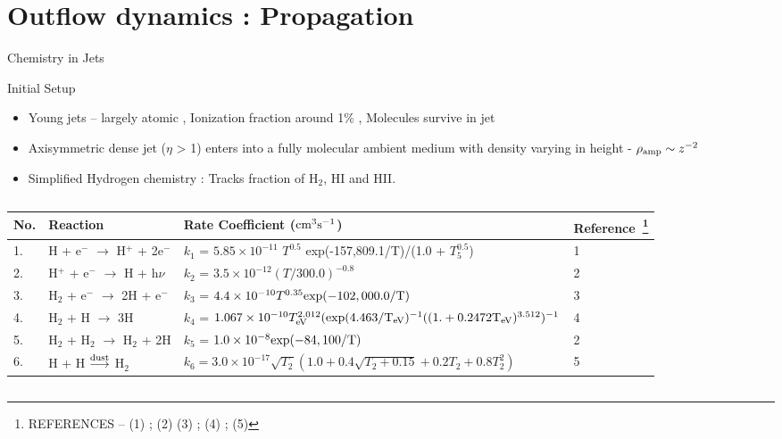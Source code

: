 \documentclass[8pt,xcolor=dvipsnames]{beamer}
\newcommand{\myref}[1]{{\small{\color{red}{(#1)}}}}
\begin{document}
\section{Outflow dynamics : Propagation}

\begin{frame}{Chemistry in Jets}
\begin{block}{Initial Setup}
\begin{itemize}
\item Young jets -- largely atomic \myref{Dionatos 2009}, Ionization
  fraction around 1\% \myref{Bacciotti 1995}, Molecules survive in jet
  \myref{Glassgold 1991}
\item Axisymmetric dense jet ($\eta$ > 1) enters into a fully molecular ambient
  medium with density varying in height - $\rho_{\rm amp} \sim z^{-2}$
\item Simplified Hydrogen chemistry : Tracks fraction of H$_2$, HI and
  HII. 
\end{itemize}
\end{block}
\begin{columns}
\hspace{-0.1\textwidth}
\begin{column}{0.95\textwidth}
\tiny{
\begin{tabular}{l l l l}
\hline
No. & Reaction & Rate Coefficient ($\rm {cm}^{3} s^{-1}$) &
Reference~\footnote{REFERENCES -- (1) \myref{Cen 1992 [Eq. 26a]};
  (2) \myref{Woodall 2007 [UMIST Database]} (3)
  \myref{Galli 1998 [Eq. H17]}; (4) \myref{Abel 1997
  [Tab. 3 Eq. 13]}; (5) \myref{Hollenbach 1979 [Eq. 3.8]}}\\
\hline
1. & H + e$^{-}$ $\rightarrow$ H$^{+}$ + 2e$^{-}$ & $k_1$ = $5.85
\times 10^{-11}$ $T^{0.5}$ \rm{exp}(-157,809.1/T)/(1.0 + $T_{5}^{0.5}$) & 1\\
2. & H$^{+}$ + e$^{-}$ $\rightarrow$ H + h$\nu$ & $k_2$ =
$3.5\times10^{-12} (T/300.0)^{-0.8}$ & 2\\
3. & H$_{2}$ + e$^{-}$ $\rightarrow$ 2H + e$^{-}$ & $k_3$ =
$4.4\times10^{-10} T^{0.35} \rm{exp}(-102,000.0/T)$ & 3\\
4. & H$_{2}$ + H $\rightarrow$ 3H & $k_4$ = $1.067\times10^{-10}
T_{\rm eV}^{2.012}(\rm{exp}(4.463/T_{\rm eV})^{-1}((1. + 0.2472 T_{\rm eV})^{3.512})^{-1} $& 4\\
5. &H$_{2}$ + H$_{2}$ $\rightarrow$ H$_{2}$ + 2H & $k_5$ = $1.0\times 10^{-8} \rm{exp}(-84,100/T)$ & 2\\
6. & H + H $\overset{\rm dust}\longrightarrow$ H$_{2}$ & $k_6 =
3.0\times10^{-17}\sqrt{T_{2}}(1.0 + 0.4\sqrt{T_{2} + 0.15} + 0.2T_{2} + 0.8T_{2}^{2})$ & 5 \\
\hline
\end{tabular}
}
\end{column}
\end{columns}
\end{frame}
\end{document}
